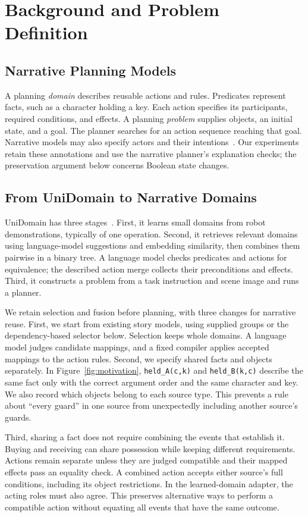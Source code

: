 \documentclass[letterpaper]{article}
\begin{document}
\section{Background and Problem Definition}
\subsection{Narrative Planning Models}
A planning \emph{domain} describes reusable actions and rules. Predicates represent facts, such as a character holding a key. Each action specifies its participants, required conditions, and effects. A planning \emph{problem} supplies objects, an initial state, and a goal. The planner searches for an action sequence reaching that goal. Narrative models may also specify actors and their intentions~\cite{riedl2010narrative}. Our experiments retain these annotations and use the narrative planner's explanation checks; the preservation argument below concerns Boolean state changes.

\subsection{From UniDomain to Narrative Domains}
UniDomain has three stages~\cite{ye2025unidomain}. First, it learns small domains from robot demonstrations, typically of one operation. Second, it retrieves relevant domains using language-model suggestions and embedding similarity, then combines them pairwise in a binary tree. A language model checks predicates and actions for equivalence; the described action merge collects their preconditions and effects. Third, it constructs a problem from a task instruction and scene image and runs a planner.

We retain selection and fusion before planning, with three changes for narrative reuse. First, we start from existing story models, using supplied groups or the dependency-based selector below. Selection keeps whole domains. A language model judges candidate mappings, and a fixed compiler applies accepted mappings to the action rules. Second, we specify shared facts and objects separately. In Figure~\ref{fig:motivation}, \texttt{held\_A(c,k)} and \texttt{held\_B(k,c)} describe the same fact only with the correct argument order and the same character and key. We also record which objects belong to each source type. This prevents a rule about ``every guard'' in one source from unexpectedly including another source's guards.

Third, sharing a fact does not require combining the events that establish it. Buying and receiving can share possession while keeping different requirements. Actions remain separate unless they are judged compatible and their mapped effects pass an equality check. A combined action accepts either source's full conditions, including its object restrictions. In the learned-domain adapter, the acting roles must also agree. This preserves alternative ways to perform a compatible action without equating all events that have the same outcome.
\end{document}
